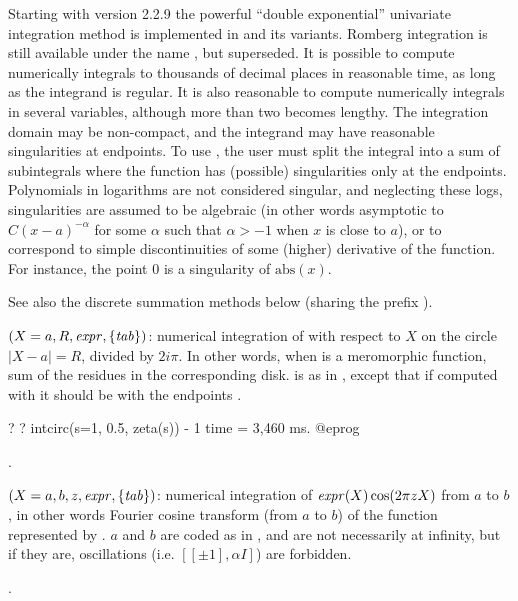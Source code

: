 Starting with version 2.2.9 the powerful ``double exponential'' univariate
integration method is implemented in  and its variants. Romberg
integration is still available under the name , but
superseded. It is possible to compute numerically integrals to thousands of
decimal places in reasonable time, as long as the integrand is regular. It is
also reasonable to compute numerically integrals in several variables,
although more than two becomes lengthy. The integration domain may be
non-compact, and the integrand may have reasonable singularities at
endpoints. To use , the user must split the integral into a sum
of subintegrals where the function has (possible) singularities only at the
endpoints. Polynomials in logarithms are not considered singular, and
neglecting these logs, singularities are assumed to be algebraic (in other
words asymptotic to $C(x-a)^{-\alpha}$ for some $\alpha$ such that
$\alpha>-1$ when $x$ is close to $a$), or to correspond to simple
discontinuities of some (higher) derivative of the function. For instance,
the point $0$ is a singularity of $\text{abs}(x)$.

See also the discrete summation methods below (sharing the prefix ).

$(X=a,R,\hbox{\it expr\/}, \{\hbox{\it tab\/}\})$: numerical
integration of  with respect to $X$ on the circle $|X-a|=R$,
divided by $2i\pi$. In other words, when  is a meromorphic
function, sum of the residues in the corresponding disk.  is as in
, except that if computed with  it should be with
the endpoints \kbd{[-1, 1]}.

\bprog
? 
? intcirc(s=1, 0.5, zeta(s)) - 1
time = 3,460 ms.
@eprog

.

$(X=a,b,z,\hbox{\it expr\/},\{\hbox{\it tab\/}\})$: numerical
integration of $\hbox{\it expr\/}(X)\cos(2\pi zX)$ from $a$ to $b$, in other words
Fourier cosine transform (from $a$ to $b$) of the function represented by
. $a$ and $b$ are coded as in , and are not necessarily
at infinity, but if they are, oscillations (i.e. $[[\pm1],\alpha I]$) are
forbidden.

.

